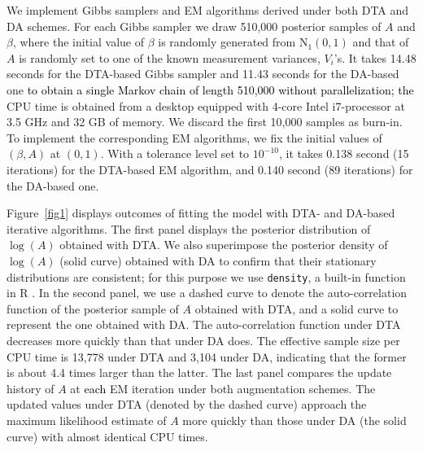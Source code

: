 \documentclass[12pt]{article}
\begin{document}
We implement Gibbs samplers and EM algorithms derived under both DTA and DA schemes. For each Gibbs sampler we draw 510,000 posterior samples of $A$ and $\beta$, where the initial value of $\beta$ is randomly generated from $\textrm{N}_1(0, 1)$ and that of $A$ is randomly set to one of the known measurement variances, $V_i$'s. It takes 14.48   seconds  for the DTA-based Gibbs sampler and 11.43 seconds for the DA-based one \textcolor{black}{to obtain a single Markov chain of length 510,000 without parallelization; the} CPU time is obtained from a desktop equipped with 4-core Intel i7-processor at 3.5 GHz and 32 GB of memory. We discard the first 10,000 samples as burn-in. To implement the corresponding EM algorithms, we fix the initial values of $(\beta, A)$ at $(0, 1)$. With a tolerance level set to $10^{-10}$, it takes 0.138 second (15 iterations) for the DTA-based EM algorithm, and 0.140 second (89 iterations) for the DA-based one. 



Figure~\ref{fig1} displays  outcomes of fitting the model with DTA- and DA-based iterative algorithms. The first panel displays the posterior distribution of $\log(A)$ obtained with DTA.  We also superimpose the posterior density of $\log(A)$ (solid curve) obtained with DA to confirm that their stationary distributions are consistent; for this purpose we use \texttt{density}, a built-in function in R \citep{r2019}.  In the second panel, we use a dashed curve to denote the auto-correlation function of the  posterior sample of $A$ obtained with  DTA,  and a solid curve to represent the one obtained with DA.  The auto-correlation function under DTA decreases more quickly than that under DA does.  The effective sample size per CPU time is 13,778 under DTA and 3,104 under DA, indicating that the former is about 4.4 times larger than the latter.   The last panel compares the update history of $A$ at \textcolor{black}{each} EM iteration under both augmentation schemes. The updated values under DTA (denoted by the dashed curve) approach  the maximum likelihood estimate of $A$ more quickly than those under DA (the solid curve) with almost identical CPU times.
\end{document}
